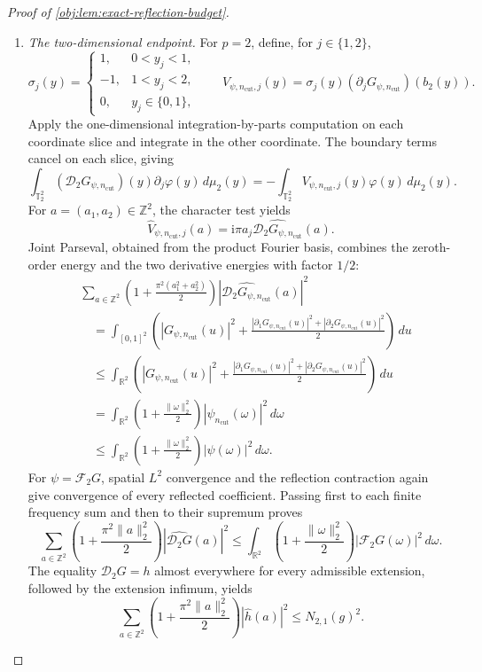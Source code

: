 \documentclass[11pt]{article}
\begin{document}
\begin{proof}[Proof of \cref{obj:lem:exact-reflection-budget}]
\begin{enumerate}
\item \textit{The two-dimensional endpoint.}
For \(p=2\), define, for \(j\in\{1,2\}\),
\[
\sigma_j(y)=
\begin{cases}
1,&0<y_j<1,\\
-1,&1<y_j<2,\\
0,&y_j\in\{0,1\},
\end{cases}
\qquad
V_{\psi,n_{\mathrm{cut}},j}(y)
=
\sigma_j(y)
(\partial_jG_{\psi,n_{\mathrm{cut}}})(b_2(y)).
\]
Apply the one-dimensional integration-by-parts computation on each coordinate slice and integrate in the other coordinate. The boundary terms cancel on each slice, giving
\[
\int_{\mathbb T_2^2}
(\mathscr D_2G_{\psi,n_{\mathrm{cut}}})(y)
\partial_j\varphi(y)\,d\mu_2(y)
=
-\int_{\mathbb T_2^2}
V_{\psi,n_{\mathrm{cut}},j}(y)\varphi(y)\,d\mu_2(y).
\]
For \(a=(a_1,a_2)\in\mathbb Z^2\), the character test yields
\[
\widehat V_{\psi,n_{\mathrm{cut}},j}(a)
=
\mathrm i\pi a_j
\widehat{\mathscr D_2G_{\psi,n_{\mathrm{cut}}}}(a).
\]
Joint Parseval, obtained from the product Fourier basis, combines the zeroth-order energy and the two derivative energies with factor \(1/2\):
\[
\begin{aligned}
&\sum_{a\in\mathbb Z^2}
\left(1+\frac{\pi^2(a_1^2+a_2^2)}2\right)
\left|\widehat{\mathscr D_2G_{\psi,n_{\mathrm{cut}}}}(a)\right|^2\\
&\quad=
\int_{[0,1]^2}
\left(
|G_{\psi,n_{\mathrm{cut}}}(u)|^2+
\frac{
|\partial_1G_{\psi,n_{\mathrm{cut}}}(u)|^2+
|\partial_2G_{\psi,n_{\mathrm{cut}}}(u)|^2}{2}
\right)\,du\\
&\quad\leq
\int_{\mathbb R^2}
\left(
|G_{\psi,n_{\mathrm{cut}}}(u)|^2+
\frac{
|\partial_1G_{\psi,n_{\mathrm{cut}}}(u)|^2+
|\partial_2G_{\psi,n_{\mathrm{cut}}}(u)|^2}{2}
\right)\,du\\
&\quad=
\int_{\mathbb R^2}
\left(1+\frac{\|\omega\|_2^2}{2}\right)
|\psi_{n_{\mathrm{cut}}}(\omega)|^2\,d\omega\\
&\quad\leq
\int_{\mathbb R^2}
\left(1+\frac{\|\omega\|_2^2}{2}\right)|\psi(\omega)|^2\,d\omega.
\end{aligned}
\]
For \(\psi=\mathcal F_2G\), spatial \(L^2\) convergence and the reflection contraction again give convergence of every reflected coefficient. Passing first to each finite frequency sum and then to their supremum proves
\[
\sum_{a\in\mathbb Z^2}
\left(1+\frac{\pi^2\|a\|_2^2}{2}\right)
|\widehat{\mathscr D_2G}(a)|^2
\leq
\int_{\mathbb R^2}
\left(1+\frac{\|\omega\|_2^2}{2}\right)
|\mathcal F_2G(\omega)|^2\,d\omega.
\]
The equality \(\mathscr D_2G=h\) almost everywhere for every admissible extension, followed by the extension infimum, yields
\[
\sum_{a\in\mathbb Z^2}
\left(1+\frac{\pi^2\|a\|_2^2}{2}\right)|\widehat h(a)|^2
\leq N_{2,1}(g)^2.
\]


\end{enumerate}
\end{proof}
\end{document}
